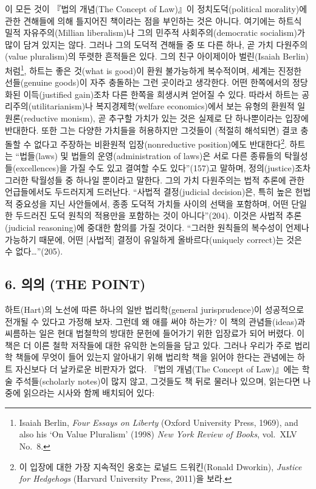 이 모든 것이 『법의 개념(The Concept of Law)』이 정치도덕(political
morality)에 관한 견해들에 의해 틀지어진 책이라는 점을 부인하는 것은
아니다. 여기에는 하트식 밀적 자유주의(Millian liberalism)나 그의 민주적
사회주의(democratic socialism)가 많이 담겨 있지는 않다. 그러나 그의
도덕적 견해들 중 또 다른 하나, 곧 가치 다원주의(value pluralism)의
뚜렷한 흔적들은 있다. 그의 친구 아이제이아 벌린(Isaiah
Berlin)처럼\footnote{Isaiah Berlin, \emph{Four Essays on Liberty}
  (Oxford University Press, 1969), and also his `On Value Pluralism'
  (1998) \emph{New York Review of Books}, vol.~XLV No.~8.}, 하트는 좋은
것(what is good)이 환원 불가능하게 복수적이며, 세계는 진정한
선들(genuine goods)이 자주 충돌하는 그런 곳이라고 생각한다. 어떤
한쪽에서의 정당화된 이득(justified gain)조차 다른 한쪽을 희생시켜 얻어질
수 있다. 따라서 하트는 공리주의(utilitarianism)나 복지경제학(welfare
economics)에서 보는 유형의 환원적 일원론(reductive monism), 곧 추구할
가치가 있는 것은 실제로 단 하나뿐이라는 입장에 반대한다. 또한 그는
다양한 가치들을 허용하지만 그것들이 (적절히 해석되면) 결코 충돌할 수
없다고 주장하는 비환원적 입장(nonreductive position)에도
반대한다\footnote{이 입장에 대한 가장 지속적인 옹호는 로널드
  드워킨(Ronald Dworkin), \emph{Justice for Hedgehogs} (Harvard
  University Press, 2011)을 보라.}. 하트는 “법들(laws) 및 법들의
운영(administration of laws)은 서로 다른 종류들의
탁월성들(excellences)을 가질 수도 있고 결여할 수도 있다”(157)고 말하며,
정의(justice)조차 그러한 탁월성들 중 하나일 뿐이라고 말한다. 그의 가치
다원주의는 법적 추론에 관한 언급들에서도 두드러지게 드러난다. “사법적
결정(judicial decision)은, 특히 높은 헌법적 중요성을 지닌 사안들에서,
종종 도덕적 가치들 사이의 선택을 포함하며, 어떤 단일한 두드러진 도덕
원칙의 적용만을 포함하는 것이 아니다”(204). 이것은 사법적 추론(judicial
reasoning)에 중대한 함의를 가질 것이다. “그러한 원칙들의 복수성이
언제나 가능하기 때문에, 어떤 {[}사법적{]} 결정이 유일하게
올바르다(uniquely correct)는 것은  수
없다\ldots{}”(205).

\subsection{6. 의의 (THE POINT)}\label{uxc758uxc758-the-point}

하트(Hart)의 노선에 따른 하나의 일반 법리학(general jurisprudence)이
성공적으로 전개될 수 있다고 가정해 보자. 그런데 왜 애를 써야 하는가? 이
책의 관념들(ideas)과 씨름하는 일은 현대 법철학의 방대한 문헌에 들어가기
위한 입장료가 되어 버렸다. 이 책은 더 이른 철학 저작들에 대한 유익한
논의들을 담고 있다. 그러나 우리가 주로  법리학 책들에
무엇이 들어 있는지 알아내기 위해 법리학 책을 읽어야 한다는 관념에는 하트
자신보다 더 날카로운 비판자가 없다. 『법의 개념(The Concept of
Law)』에는 학술 주석들(scholarly notes)이 많지 않고, 그것들도 책 뒤로
물러나 있으며, 읽는다면 나중에 읽으라는 시사와 함께 배치되어 있다:

